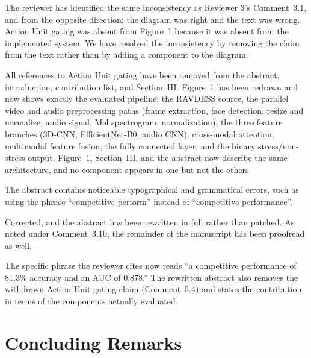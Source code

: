 \response The reviewer has identified the same inconsistency as
Reviewer 3's Comment~3.1, and from the opposite direction: the diagram
was right and the text was wrong. Action Unit gating was absent from
Figure~1 because it was absent from the implemented system. We have
resolved the inconsistency by removing the claim from the text rather
than by adding a component to the diagram.

\begin{changesblock}
All references to Action Unit gating have been removed from the
abstract, introduction, contribution list, and Section~III. Figure~1 has
been redrawn and now shows exactly the evaluated pipeline: the RAVDESS
source, the parallel video and audio preprocessing paths (frame
extraction, face detection, resize and normalize; audio signal, Mel
spectrogram, normalization), the three feature branches (3D-CNN,
EfficientNet-B0, audio CNN), cross-modal attention, multimodal feature
fusion, the fully connected layer, and the binary stress/non-stress
output. Figure~1, Section~III, and the abstract now describe the same
architecture, and no component appears in one but not the others.
\end{changesblock}


\begin{reviewercomment}
The abstract contains noticeable typographical and grammatical errors,
such as using the phrase ``competitive perform'' instead of ``competitive
performance''.
\end{reviewercomment}

\response Corrected, and the abstract has been rewritten in full rather
than patched. As noted under Comment~3.10, the remainder of the
manuscript has been proofread as well.

\begin{changesblock}
The specific phrase the reviewer cites now reads ``a
competitive performance of 81.3\% accuracy and an AUC of 0.878.'' The
rewritten abstract also removes the withdrawn Action Unit gating claim
(Comment~5.4) and states the contribution in terms of the components
actually evaluated.
\end{changesblock}

\section*{Concluding Remarks}

